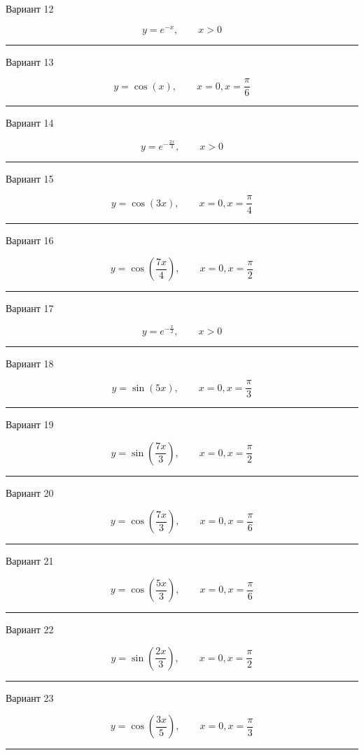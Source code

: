 \documentclass[11pt]{report}
\begin{document}
Вариант 12

$$y=e^{- x}, \qquad x > 0$$

\rule{\textwidth}{.2mm}

Вариант 13

$$y=\cos{\left(x \right)}, \qquad x = 0, x = \frac{\pi}{6}$$

\rule{\textwidth}{.2mm}

Вариант 14

$$y=e^{- \frac{2 x}{3}}, \qquad x > 0$$

\rule{\textwidth}{.2mm}

Вариант 15

$$y=\cos{\left(3 x \right)}, \qquad x = 0, x = \frac{\pi}{4}$$

\rule{\textwidth}{.2mm}

Вариант 16

$$y=\cos{\left(\frac{7 x}{4} \right)}, \qquad x = 0, x = \frac{\pi}{2}$$

\rule{\textwidth}{.2mm}

Вариант 17

$$y=e^{- \frac{x}{2}}, \qquad x > 0$$

\rule{\textwidth}{.2mm}

Вариант 18

$$y=\sin{\left(5 x \right)}, \qquad x = 0, x = \frac{\pi}{3}$$

\rule{\textwidth}{.2mm}

Вариант 19

$$y=\sin{\left(\frac{7 x}{3} \right)}, \qquad x = 0, x = \frac{\pi}{2}$$

\rule{\textwidth}{.2mm}

Вариант 20

$$y=\cos{\left(\frac{7 x}{3} \right)}, \qquad x = 0, x = \frac{\pi}{6}$$

\rule{\textwidth}{.2mm}

Вариант 21

$$y=\cos{\left(\frac{5 x}{3} \right)}, \qquad x = 0, x = \frac{\pi}{6}$$

\rule{\textwidth}{.2mm}

Вариант 22

$$y=\sin{\left(\frac{2 x}{3} \right)}, \qquad x = 0, x = \frac{\pi}{2}$$

\rule{\textwidth}{.2mm}

Вариант 23

$$y=\cos{\left(\frac{3 x}{5} \right)}, \qquad x = 0, x = \frac{\pi}{3}$$

\rule{\textwidth}{.2mm}
\end{document}
